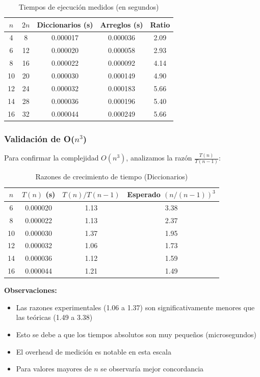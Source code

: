 \documentclass[12pt,letterpaper]{article}
\begin{document}
\begin{table}[H]
\centering
\caption{Tiempos de ejecución medidos (en segundos)}
\begin{tabular}{ccccc}
\toprule
$n$ & $2n$ & Diccionarios (s) & Arreglos (s) & Ratio \\
\midrule
4 & 8 & 0.000017 & 0.000036 & 2.09 \\
6 & 12 & 0.000020 & 0.000058 & 2.93 \\
8 & 16 & 0.000022 & 0.000092 & 4.14 \\
10 & 20 & 0.000030 & 0.000149 & 4.90 \\
12 & 24 & 0.000032 & 0.000183 & 5.66 \\
14 & 28 & 0.000036 & 0.000196 & 5.40 \\
16 & 32 & 0.000044 & 0.000249 & 5.66 \\
\bottomrule
\end{tabular}
\end{table}

\subsubsection{Validación de O($n^3$)}

Para confirmar la complejidad $O(n^3)$, analizamos la razón $\frac{T(n)}{T(n-1)}$:

\begin{table}[H]
\centering
\caption{Razones de crecimiento de tiempo (Diccionarios)}
\begin{tabular}{cccc}
\toprule
$n$ & $T(n)$ (s) & $T(n)/T(n-1)$ & Esperado $(n/(n-1))^3$ \\
\midrule
6 & 0.000020 & 1.13 & 3.38 \\
8 & 0.000022 & 1.13 & 2.37 \\
10 & 0.000030 & 1.37 & 1.95 \\
12 & 0.000032 & 1.06 & 1.73 \\
14 & 0.000036 & 1.12 & 1.59 \\
16 & 0.000044 & 1.21 & 1.49 \\
\bottomrule
\end{tabular}
\end{table}

\textbf{Observaciones:}
\begin{itemize}
    \item Las razones experimentales (1.06 a 1.37) son significativamente menores que las teóricas (1.49 a 3.38)
    \item Esto se debe a que los tiempos absolutos son muy pequeños (microsegundos)
    \item El overhead de medición es notable en esta escala
    \item Para valores mayores de $n$ se observaría mejor concordancia
\end{itemize}
\end{document}
